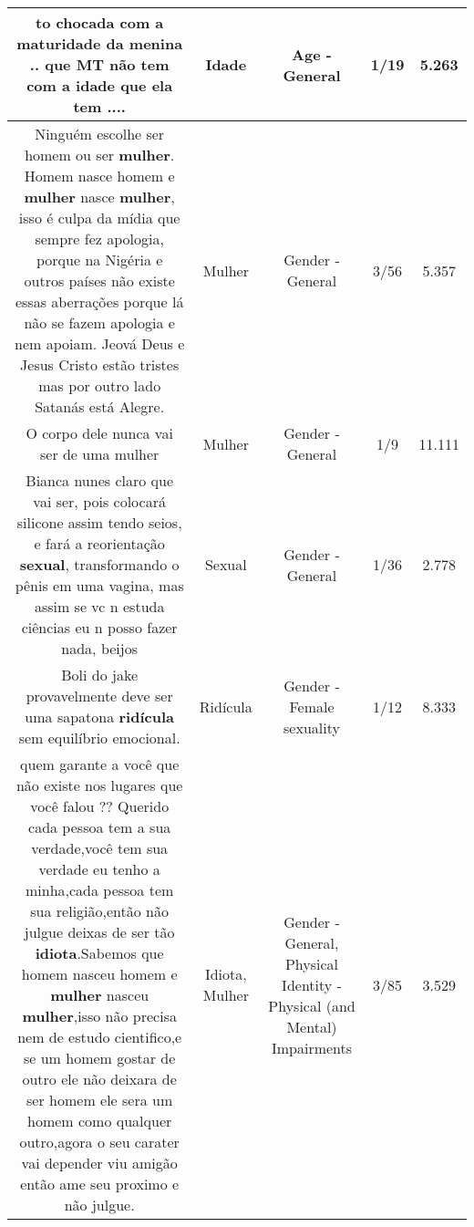 \documentclass[11pt]{article}
\newlength\mylength
\begin{document}
\begin{center}
\begin{longtable}{|C{.65\mylength}|C{.30\mylength}|C{.12\mylength}|C{.12\mylength}|C{.12\mylength}|}
  \small to chocada com a maturidade da menina .. que MT não tem com a \textbf{idade} que ela tem ....\normalsize   & Idade & Age - General & 1/19 & 5.263 \\  \hline
  \small Ninguém escolhe ser homem ou ser \textbf{mulher}. Homem nasce homem e \textbf{mulher} nasce \textbf{mulher}, isso é culpa da mídia que sempre fez apologia, porque na Nigéria e outros países não existe essas aberrações porque lá não se fazem apologia e nem apoiam. Jeová Deus e Jesus Cristo estão tristes mas por outro lado Satanás está Alegre.\normalsize   & Mulher & Gender - General & 3/56 & 5.357 \\  \hline
  \small O corpo dele nunca vai ser de uma mulher\normalsize   & Mulher & Gender - General & 1/9 & 11.111 \\  \hline
  \small Bianca nunes claro que vai ser, pois colocará silicone assim tendo seios, e fará a reorientação \textbf{sexual}, transformando o pênis em uma vagina, mas assim se vc n estuda ciências eu n posso fazer nada, beijos\normalsize   & Sexual & Gender - General & 1/36 & 2.778 \\  \hline
  \small Boli do jake provavelmente deve ser uma sapatona \textbf{ridícula} sem equilíbrio emocional.\normalsize   & Ridícula & Gender - Female sexuality & 1/12 & 8.333 \\  \hline
  \small quem garante a você que não existe nos lugares que você falou ?? Querido cada pessoa tem a sua verdade,você tem sua verdade eu tenho a minha,cada pessoa tem sua religião,então não julgue deixas de ser tão \textbf{idiota}.Sabemos que homem nasceu homem e \textbf{mulher} nasceu \textbf{mulher},isso não precisa nem de estudo cientifico,e se um homem gostar de outro ele não deixara de ser homem ele sera um homem como qualquer outro,agora o seu carater vai depender viu amigão então ame seu proximo e não julgue.\normalsize   & Idiota, Mulher & Gender - General, Physical Identity - Physical (and Mental) Impairments & 3/85 & 3.529 \\  \hline

\end{longtable}
\end{center}
\end{document}
